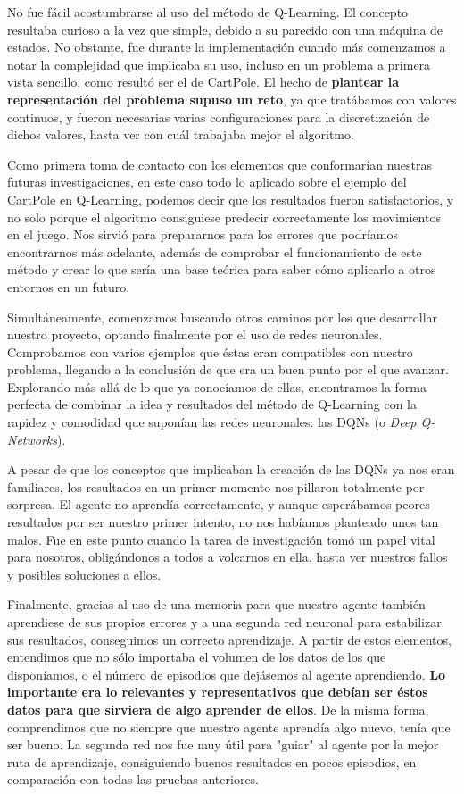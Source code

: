 No fue fácil acostumbrarse al uso del método de Q-Learning. El concepto resultaba curioso a la vez que simple, debido a su parecido con una máquina de estados. No obstante, fue durante la implementación cuando más comenzamos a notar la complejidad que implicaba su uso, incluso en un problema a primera vista sencillo, como resultó ser el de CartPole. El hecho de \textbf{plantear la representación del problema supuso un reto}, ya que tratábamos con valores continuos, y fueron necesarias varias configuraciones para la discretización de dichos valores, hasta ver con cuál trabajaba mejor el algoritmo.

Como primera toma de contacto con los elementos que conformarían nuestras futuras investigaciones, en este caso todo lo aplicado sobre el ejemplo del CartPole en Q-Learning, podemos decir que los resultados fueron satisfactorios, y no solo porque el algoritmo consiguiese predecir correctamente los movimientos en el juego. Nos sirvió para prepararnos para los errores que podríamos encontrarnos más adelante, además de comprobar el funcionamiento de este método y crear lo que sería una base teórica para saber cómo aplicarlo a otros entornos en un futuro.

Simultáneamente, comenzamos buscando otros caminos por los que desarrollar nuestro proyecto, optando finalmente por el uso de redes neuronales. Comprobamos con varios ejemplos que éstas eran compatibles con nuestro problema, llegando a la conclusión de que era un buen punto por el que avanzar. Explorando más allá de lo que ya conocíamos de ellas, encontramos la forma perfecta de combinar la idea y resultados del método de Q-Learning con la rapidez y comodidad que suponían las redes neuronales: las DQNs (o \textit{Deep Q-Networks}). 

A pesar de que los conceptos que implicaban la creación de las DQNs ya nos eran familiares, los resultados en un primer momento nos pillaron totalmente por sorpresa. El agente no aprendía correctamente, y aunque esperábamos peores resultados por ser nuestro primer intento, no nos habíamos planteado unos tan malos. Fue en este punto cuando la tarea de investigación tomó un papel vital para nosotros, obligándonos a todos a volcarnos en ella, hasta ver nuestros fallos y posibles soluciones a ellos. 

Finalmente, gracias al uso de una memoria para que nuestro agente también aprendiese de sus propios errores y a una segunda red neuronal para estabilizar sus resultados, conseguimos un correcto aprendizaje. A partir de estos elementos, entendimos que no sólo importaba el volumen de los datos de los que disponíamos, o el número de episodios que dejásemos al agente aprendiendo. \textbf{Lo importante era lo relevantes y representativos que debían ser éstos datos para que sirviera de algo aprender de ellos}. De la misma forma, comprendimos que no siempre que nuestro agente aprendía algo nuevo, tenía que ser bueno. La segunda red nos fue muy útil para "guiar" al agente por la mejor ruta de aprendizaje, consiguiendo buenos resultados en pocos episodios, en comparación con todas las pruebas anteriores.  

